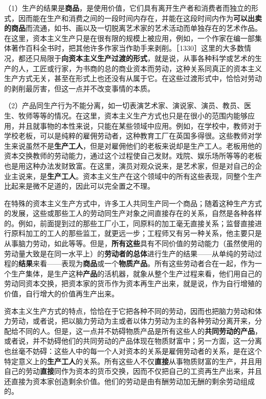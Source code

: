 （1）生产的结果是\textbf{商品}，是使用价值，它们具有离开生产者和消费者而独立的形式，因而能在生产和消费之间的一段时间内存在，并能在这段时间内作为\textbf{可以出卖的商品}而流通，如书、画以及一切脱离艺术家的艺术活动而单独存在的艺术作品。在这里，资本主义生产只是在很有限的规模上被应用，例如，一个作家在编一部集体著作百科全书时，把其他许多作家当作助手来剥削。［1330］这里的大多数情况，都还只局限于\textbf{向资本主义生产过渡的形式}，就是说，从事各种科学或艺术的生产的人，工匠或行家，为书商的总的商业资本而劳动，这种关系同真正的资本主义生产方式无关，甚至在形式上也还没有从属于它。在这些过渡形式中，恰恰对劳动的剥削最厉害，但这一点并不改变事情的本质。

（2）产品同生产行为不能分离，如一切表演艺术家、演说家、演员、教员、医生、牧师等等的情况。在这里，资本主义生产方式也只是在很小的范围内能够应用，并且就事物的本性来说，只能在某些领域中应用。例如，在学校中，教师对于学校老板，可以是纯粹的雇佣劳动者，这种教育工厂在英国多得很。这些教师对学生来说虽然不是\textbf{生产工人}，但是对雇佣他们的老板来说却是生产工人。老板用他的资本交换教师的劳动能力，通过这个过程使自己发财。戏院、娱乐场所等等的老板也是用这种办法发财致富。在这里，演员对观众说来，是艺术家，但是对自己的企业主说来，是\textbf{生产工人}。资本主义生产在这个领域中的所有这些表现，同整个生产比起来是微不足道的，因此可以完全置之不理。


在特殊的资本主义生产方式中，许多工人共同生产同一个商品；随着这种生产方式的发展，这些或那些工人的劳动同生产对象之间直接存在的关系，自然是各种各样的。例如，前面提到过的那些工厂小工，同原料的加工毫无直接关系；监督直接进行原料加工的工人的那些监工，就更远一步；工程师又有另一种关系，他主要只是从事脑力劳动，如此等等。但是，\textbf{所有这些}具有不同价值的劳动能力（虽然使用的劳动量大致是在同一水平上）的\textbf{劳动者的总体}进行生产的结果——从单纯的劳动过程的\textbf{结果}来看——表现为\textbf{商品}或一个\textbf{物质产品}。所有这些劳动者合在一起，作为一个生产集体，是生产这种\textbf{产品}的活机器，就象从整个生产过程来看，他们用自己的劳动同资本交换，把资本家的货币作为资本再生产出来，就是说，作为自行增殖的价值，自行增大的价值再生产出来。

资本主义生产方式的特点，恰恰在于它把各种不同的劳动，因而也把脑力劳动和体力劳动，或者说，把以脑力劳动为主或者以体力劳动为主的各种劳动分离开来，分配给不同的人。但是，这一点并不妨碍物质产品是所有这些人的\textbf{共同劳动的产品}，或者说，并不妨碍他们的共同劳动的产品体现在物质财富中；另一方面，这一分离也丝毫不妨碍：这些人中的每一个人对资本的关系是雇佣劳动者的关系，是在这个特定意义上的\textbf{生产工人}的关系。所有这些人不仅\textbf{直接}从事物质财富的生产，并且用自己的劳动\textbf{直接}同作为资本的货币交换，因而不仅把自己的工资再生产出来，并且还直接为资本家创造剩余价值。他们的劳动是由有酬劳动加无酬的剩余劳动组成的。

